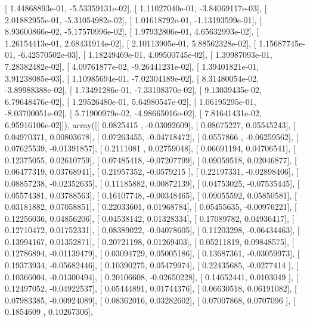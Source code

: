 \documentclass{article}
\begin{document}
       [  1.44868893e-01,  -5.53359131e-02],
       [  1.11027040e-01,  -3.84069117e-03],
       [  2.01882955e-01,  -5.31054982e-02],
       [  1.01618792e-01,  -1.13193599e-01],
       [  8.93600866e-02,  -5.17570996e-02],
       [  1.97932806e-01,   4.65632993e-02],
       [  1.26154413e-01,   2.68431914e-02],
       [  2.10113905e-01,   5.88562328e-02],
       [  1.15687745e-01,  -6.42570502e-03],
       [  1.18249469e-01,   4.09500745e-02],
       [  1.39987093e-01,   7.28382482e-02],
       [  4.09761877e-02,  -9.26441231e-02],
       [  1.39401821e-01,   3.91238085e-03],
       [  1.10985694e-01,  -7.02304189e-02],
       [  8.31480054e-02,  -3.89988388e-02],
       [  1.73491286e-01,  -7.33108370e-02],
       [  9.13039435e-02,   6.79648476e-02],
       [  1.29526480e-01,   5.64980547e-02],
       [  1.06195295e-01,  -8.03700051e-02],
       [  5.71900979e-02,  -4.98665016e-02],
       [  7.81641431e-02,   6.95916106e-02]]), array([[ 0.0825415 , -0.03092609],
       [ 0.08675227,  0.05545243],
       [ 0.04970371,  0.00803678],
       [ 0.07263455, -0.04718472],
       [ 0.0557866 , -0.06259562],
       [ 0.07625539, -0.01391857],
       [ 0.2111081 ,  0.02759048],
       [ 0.06691194,  0.04706541],
       [ 0.12375055,  0.02610759],
       [ 0.07485418, -0.07207799],
       [ 0.09059518,  0.02046877],
       [ 0.06477319,  0.03768941],
       [ 0.21957352, -0.0579215 ],
       [ 0.22197331, -0.02898406],
       [ 0.08857238, -0.02352635],
       [ 0.11185882,  0.00872139],
       [ 0.04753025, -0.07535445],
       [ 0.05574381,  0.03788563],
       [ 0.16107748, -0.00348465],
       [ 0.09055592,  0.05850581],
       [ 0.03181882,  0.07058851],
       [ 0.22033601,  0.01968784],
       [ 0.05455635, -0.00976221],
       [ 0.12256036,  0.04856206],
       [ 0.04538142,  0.01328334],
       [ 0.17089782,  0.04936417],
       [ 0.12710472,  0.01752331],
       [ 0.08389022, -0.04078605],
       [ 0.11203298, -0.06434463],
       [ 0.13994167,  0.01352871],
       [ 0.20721198,  0.01269403],
       [ 0.05211819,  0.09848575],
       [ 0.12786894, -0.01139479],
       [ 0.03094729,  0.05005186],
       [ 0.13687361, -0.03059973],
       [ 0.19373934, -0.05682446],
       [ 0.10390275,  0.05479974],
       [ 0.22435685, -0.0277414 ],
       [ 0.10366004, -0.01300494],
       [ 0.20106608, -0.02650228],
       [ 0.14652441,  0.0103049 ],
       [ 0.12497052, -0.04922537],
       [ 0.05444891,  0.01744376],
       [ 0.06630518,  0.06191082],
       [ 0.07983385, -0.00924089],
       [ 0.08362016,  0.03282602],
       [ 0.07007868,  0.0707096 ],
       [ 0.1854609 ,  0.10267306],
\end{document}
